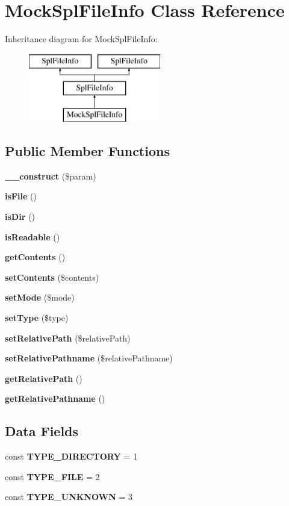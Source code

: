 \section{Mock\+Spl\+File\+Info Class Reference}
\label{class_symfony_1_1_component_1_1_finder_1_1_tests_1_1_iterator_1_1_mock_spl_file_info}
Inheritance diagram for Mock\+Spl\+File\+Info\+:\begin{figure}[H]
\begin{center}
\leavevmode
\includegraphics[height=3.000000cm]{class_symfony_1_1_component_1_1_finder_1_1_tests_1_1_iterator_1_1_mock_spl_file_info}
\end{center}
\end{figure}
\subsection*{Public Member Functions}
\begin{DoxyCompactItemize}
\item 
{\bf \+\_\+\+\_\+construct} (\$param)
\item 
{\bf is\+File} ()
\item 
{\bf is\+Dir} ()
\item 
{\bf is\+Readable} ()
\item 
{\bf get\+Contents} ()
\item 
{\bf set\+Contents} (\$contents)
\item 
{\bf set\+Mode} (\$mode)
\item 
{\bf set\+Type} (\$type)
\item 
{\bf set\+Relative\+Path} (\$relative\+Path)
\item 
{\bf set\+Relative\+Pathname} (\$relative\+Pathname)
\item 
{\bf get\+Relative\+Path} ()
\item 
{\bf get\+Relative\+Pathname} ()
\end{DoxyCompactItemize}
\subsection*{Data Fields}
\begin{DoxyCompactItemize}
\item 
const {\bf T\+Y\+P\+E\+\_\+\+D\+I\+R\+E\+C\+T\+O\+R\+Y} = 1
\item 
const {\bf T\+Y\+P\+E\+\_\+\+F\+I\+L\+E} = 2
\item 
const {\bf T\+Y\+P\+E\+\_\+\+U\+N\+K\+N\+O\+W\+N} = 3
\end{DoxyCompactItemize}


